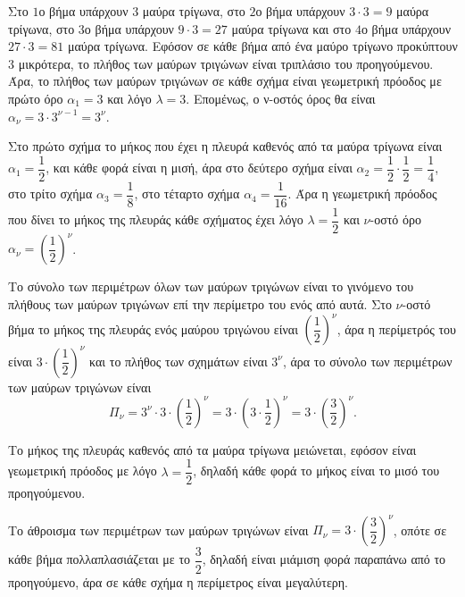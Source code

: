 
\begin{alist}
\item Στο $1$ο βήμα υπάρχουν $3$ μαύρα τρίγωνα,
στο $2$ο βήμα υπάρχουν $3 \cdot 3 = 9$ μαύρα τρίγωνα,
στο $3$ο βήμα υπάρχουν $9 \cdot 3 = 27$ μαύρα τρίγωνα και
στο $4$ο βήμα υπάρχουν $27 \cdot 3 = 81$ μαύρα τρίγωνα.
Εφόσον σε κάθε βήμα από ένα μαύρο τρίγωνο προκύπτουν $3$ μικρότερα, το πλήθος των
μαύρων τριγώνων είναι τριπλάσιο του προηγούμενου. Άρα, το πλήθος των μαύρων
τριγώνων σε κάθε σχήμα είναι γεωμετρική πρόοδος με πρώτο όρο $\alpha_1 = 3$ και λόγο $\lambda = 3$.
Επομένως, ο ν-οστός όρος θα είναι $\alpha_{\nu} = 3 \cdot 3^{\nu - 1} = 3^{\nu}$.

\item Στο πρώτο σχήμα το μήκος που έχει η πλευρά καθενός από τα μαύρα τρίγωνα είναι
$\alpha_1 = \dfrac{1}{2}$, και κάθε φορά είναι η μισή, άρα στο δεύτερο σχήμα είναι $\alpha_2 = \dfrac{1}{2} \cdot \dfrac{1}{2} = \dfrac{1}{4}$, στο τρίτο σχήμα $\alpha_3 = \dfrac{1}{8}$, στο τέταρτο σχήμα $\alpha_4 = \dfrac{1}{16}$. Άρα η γεωμετρική πρόοδος που δίνει το μήκος της πλευράς κάθε σχήματος έχει λόγο $\lambda = \dfrac{1}{2}$ και $\nu$-οστό όρο $\alpha_{\nu} = \left(\dfrac{1}{2}\right)^{\nu}$.

\item Το σύνολο των περιμέτρων όλων των μαύρων τριγώνων είναι το γινόμενο του πλήθους
των μαύρων τριγώνων επί την περίμετρο του ενός από αυτά. Στο $\nu$-οστό βήμα το μήκος της πλευράς ενός μαύρου τριγώνου είναι $\left(\dfrac{1}{2}\right)^{\nu}$, άρα η περίμετρός του είναι $3 \cdot \left(\dfrac{1}{2}\right)^{\nu}$ και το πλήθος των σχημάτων είναι $3^{\nu}$, άρα το σύνολο των περιμέτρων των μαύρων τριγώνων είναι
\[\Pi_{\nu} = 3^{\nu} \cdot 3 \cdot \left(\dfrac{1}{2}\right)^{\nu} = 3 \cdot \left(3 \cdot \dfrac{1}{2}\right)^{\nu} = 3 \cdot \left(\dfrac{3}{2}\right)^{\nu}.\]

\item
\begin{rlist}
\item Το μήκος της πλευράς καθενός από τα μαύρα τρίγωνα μειώνεται, εφόσον είναι
γεωμετρική πρόοδος με λόγο $\lambda = \dfrac{1}{2}$, δηλαδή κάθε φορά το μήκος είναι το μισό του προηγούμενου.
\item Το άθροισμα των περιμέτρων των μαύρων τριγώνων είναι $\Pi_{\nu} = 3 \cdot \left(\dfrac{3}{2}\right)^{\nu}$, οπότε σε κάθε βήμα πολλαπλασιάζεται με το $\dfrac{3}{2}$, δηλαδή είναι μιάμιση φορά παραπάνω από το προηγούμενο, άρα σε κάθε σχήμα η περίμετρος είναι μεγαλύτερη.
\end{rlist}
\end{alist}



\restoregeometry


